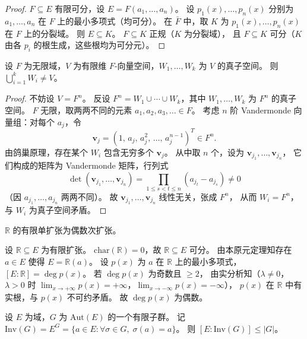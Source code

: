 \documentclass[lang=cn,a4paper,newtx]{elegantbook}
\begin{document}
\begin{proof}
  $F\subseteq E$ 有限可分，设 $E=F(a_1,\dots,a_n)$。
  设 $p_1(x),\dots,p_n(x)$ 分别为 $a_1,\dots,a_n$ 在 $F$ 上的最小多项式（均可分）。
  在 $\bar F$ 中，取 $K$ 为 $p_1(x),\dots,p_n(x)$ 在 $F$ 上的分裂域。
  则 $E\subseteq K$。
  $F\subseteq K$ 正规（$K$ 为分裂域），
  且 $F\subseteq K$ 可分（$K$ 由各 $p_i$ 的根生成，这些根均为可分元）。
\end{proof}

\begin{theorem}[填不满定理]
  设 $F$ 为无限域，$V$ 为有限维 $F$-向量空间，$W_1,\dots,W_k$ 为 $V$ 的真子空间。
  则 $\bigcup_{i=1}^{k}W_i\ne V$。
\end{theorem}

\begin{proof}
  不妨设 $V=F^n$。
  反设 $F^n=W_1\cup\cdots\cup W_k$，其中 $W_1,\dots,W_k$ 为 $F^n$ 的真子空间。
  $F$ 无限，取两两不同的元素 $a_1,a_2,a_3,\dots\in F$。
  考虑 $n$ 阶 Vandermonde 向量组：对每个 $a_j$，令
  \[
    \mathbf{v}_j=(1,\,a_j,\,a_j^2,\,\dots,\,a_j^{n-1})^T\in F^n.
  \]
  由鸽巢原理，存在某个 $W_i$ 包含无穷多个 $\mathbf{v}_j$。
  从中取 $n$ 个，设为 $\mathbf{v}_{j_1},\dots,\mathbf{v}_{j_n}$，
  它们构成的矩阵为 Vandermonde 矩阵，行列式
  \[
    \det(\mathbf{v}_{j_1},\dots,\mathbf{v}_{j_n})=\prod_{1\le s<t\le n}(a_{j_t}-a_{j_s})\ne 0
  \]
  （因 $a_{j_1},\dots,a_{j_n}$ 两两不同）。
  故 $\mathbf{v}_{j_1},\dots,\mathbf{v}_{j_n}$ 线性无关，张成 $F^n$，
  从而 $W_i=F^n$，与 $W_i$ 为真子空间矛盾。
\end{proof}



\begin{example}
  $\mathbb{R}$ 的有限单扩张为偶数次扩张。

  设 $\mathbb{R}\subseteq E$ 为有限扩张。
  $\mathrm{char}(\mathbb{R})=0$，故 $\mathbb{R}\subseteq E$ 可分。
  由本原元定理知存在 $a\in E$ 使得 $E=\mathbb{R}(a)$。
  设 $p(x)$ 为 $a$ 在 $\mathbb{R}$ 上的最小多项式，$[E:\mathbb{R}]=\deg p(x)$。
  若 $\deg p(x)$ 为奇数且 $\ge 2$，
  由实分析知（$\lambda\ne 0$，$\lambda>0$ 时 $\lim_{x\to+\infty}p(x)=+\infty$，$\lim_{x\to-\infty}p(x)=-\infty$），
  $p(x)$ 在 $\mathbb{R}$ 中有实根，与 $p(x)$ 不可约矛盾。
  故 $\deg p(x)$ 为偶数。
\end{example}

\begin{lemma}[Artin 引理]
  设 $E$ 为域，$G$ 为 $\mathrm{Aut}(E)$ 的一个有限子群。
  记 $\mathrm{Inv}(G)=E^G=\{a\in E:\forall\sigma\in G,\;\sigma(a)=a\}$。
  则 $[E:\mathrm{Inv}(G)]\le|G|$。
\end{lemma}
\end{document}
